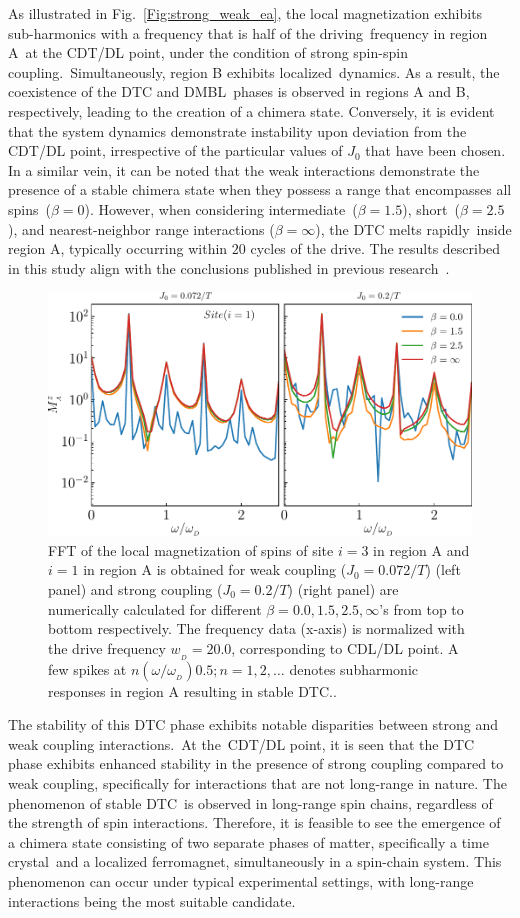\documentclass[%
nofootinbib,
reprint,
superscriptaddress,
amsmath,amssymb,showkeys,
aps,
prb,
]{revtex4-2}
\begin{document}
As illustrated in Fig.~\ref{Fig:strong_weak_ea}, the local magnetization exhibits sub-harmonics with a frequency that is half of the driving frequency in region A at the CDT/DL point, under the condition of strong spin-spin coupling. Simultaneously, region B exhibits localized dynamics. As a result, the coexistence of the DTC and DMBL phases is observed in regions A and B, respectively, leading to the creation of a chimera state. Conversely, it is evident that the system dynamics demonstrate instability upon deviation from the CDT/DL point, irrespective of the particular values of $J_0$ that have been chosen. In a similar vein, it can be noted that the weak interactions demonstrate the presence of a stable chimera state when they possess a range that encompasses all spins ($\beta=0$). However, when considering intermediate ($\beta = 1.5$), short ($\beta = 2.5$), and nearest-neighbor range interactions ($\beta = \infty$), the DTC melts rapidly inside region A, typically occurring within $20$ cycles of the drive. The results described in this study align with the conclusions published in previous research~\cite{sakurai_phys_nodate}.

\begin{figure}[t]
	\centering
	\includegraphics[width=8.cm]{single_sz_fft.pdf}
	\caption{FFT of the local magnetization of spins of site $i=3$ in region A and $i=1$ in region A is obtained for weak coupling ($J_0 = 0.072/T$) (left panel) and strong coupling ($J_0 = 0.2/T$) (right panel) are numerically calculated for different $\beta = 0.0, 1.5, 2.5, \infty$'s from top to bottom respectively. The frequency data (x-axis) is normalized with the drive frequency $w_{_{D}}=20.0$, corresponding to CDL/DL point. A few spikes at $n(\omega/\omega_{_{D}})0.5; n=1,2,\dots$ denotes subharmonic responses in region A resulting in stable DTC..}
	\label{Fig:sz_single}
\end{figure}
	
The stability of this DTC phase exhibits notable disparities between strong and weak coupling interactions. At the CDT/DL point, it is seen that the DTC phase exhibits enhanced stability in the presence of strong coupling compared to weak coupling, specifically for interactions that are not long-range in nature. The phenomenon of stable DTC is observed in long-range spin chains, regardless of the strength of spin interactions. Therefore, it is feasible to see the emergence of a chimera state consisting of two separate phases of matter, specifically a time crystal and a localized ferromagnet, simultaneously in a spin-chain system. This phenomenon can occur under typical experimental settings, with long-range interactions being the most suitable candidate.
\end{document}
